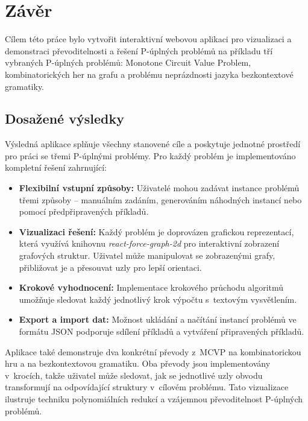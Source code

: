 \chapter{Závěr}
\label{sec:Conclusion}

Cílem této práce bylo vytvořit interaktivní webovou aplikaci pro vizualizaci a demonstraci převoditelnosti a řešení P-úplných problémů na příkladu tří vybraných P-úplných problémů: Monotone Circuit Value Problem, kombinatorických her na grafu a problému neprázdnosti jazyka bezkontextové gramatiky.

\section{Dosažené výsledky}
\label{sec:ConclusionAchievements}

Výsledná aplikace splňuje všechny stanovené cíle a poskytuje jednotné prostředí pro práci se třemi P-úplnými problémy. Pro každý problém je implementováno kompletní řešení zahrnující:

\begin{itemize}
    \item \textbf{Flexibilní vstupní způsoby:} Uživatelé mohou zadávat instance problémů třemi způsoby – manuálním zadáním, generováním náhodných instancí nebo pomocí předpřipravených příkladů.
    
    \item \textbf{Vizualizaci řešení:} Každý problém je doprovázen grafickou reprezentací, která využívá knihovnu \emph{react-force-graph-2d} pro interaktivní zobrazení grafových struktur. Uživatel může manipulovat se zobrazenými grafy, přibližovat je a přesouvat uzly pro lepší orientaci.
    
    \item \textbf{Krokové vyhodnocení:} Implementace krokového průchodu algoritmů umožňuje sledovat každý jednotlivý krok výpočtu s~textovým vysvětlením.
    
    \item \textbf{Export a import dat:} Možnost ukládání a načítání instancí problémů ve formátu JSON podporuje sdílení příkladů a vytváření připravených příkladů.
\end{itemize}

Aplikace také demonstruje dva konkrétní převody z~MCVP na kombinatorickou hru a na bezkontextovou gramatiku. Oba převody jsou implementovány v~krocích, takže uživatel může sledovat, jak se jednotlivé uzly obvodu transformují na odpovídající struktury v~cílovém problému. Tato vizualizace ilustruje techniku polynomiálních redukcí a vzájemnou převoditelnost P-úplných problémů.


